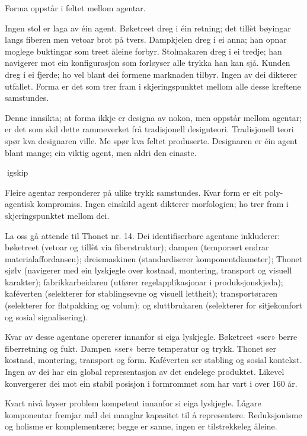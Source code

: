
Forma oppstår i feltet mellom agentar.

Ingen stol er laga av éin agent. Bøketreet dreg i éin retning; det tillèt bøyingar langs fiberen men vetoar brot på tvers. Dampkjelen dreg i ei anna; han opnar moglege buktingar som treet åleine forbyr. Stolmakaren dreg i ei tredje; han navigerer mot ein konfigurasjon som forløyser alle trykka han kan sjå. Kunden dreg i ei fjerde; ho vel blant dei formene marknaden tilbyr. Ingen av dei dikterer utfallet. Forma er det som trer fram i skjeringspunktet mellom alle desse kreftene samstundes.

Denne innsikta; at forma ikkje er designa av nokon, men oppstår mellom agentar; er det som skil dette rammeverket frå tradisjonell designteori. Tradisjonell teori spør kva designaren ville. Me spør kva feltet produserte. Designaren er éin agent blant mange; ein viktig agent, men aldri den einaste.

igskip

Fleire agentar responderer på ulike trykk samstundes. Kvar form er eit poly-agentisk kompromiss. Ingen einskild agent dikterer morfologien; ho trer fram i skjeringspunktet mellom dei.

La oss gå attende til Thonet nr. 14. Dei identifiserbare agentane inkluderer: bøketreet (vetoar og tillèt via fiberstruktur); dampen (temporært endrar materialaffordansen); dreiemaskinen (standardiserer komponentdiameter); Thonet sjølv (navigerer med ein lyskjegle over kostnad, montering, transport og visuell karakter); fabrikkarbeidaren (utfører regelapplikasjonar i produksjonskjeda); kaféverten (selekterer for stablingsevne og visuell lettheit); transportøraren (selekterer for flatpakking og volum); og sluttbrukaren (selekterer for sitjekomfort og sosial signalisering).

Kvar av desse agentane opererer innanfor si eiga lyskjegle. Bøketreet «ser» berre fiberretning og fukt. Dampen «ser» berre temperatur og trykk. Thonet ser kostnad, montering, transport og form. Kaféverten ser stabling og sosial kontekst. Ingen av dei har ein global representasjon av det endelege produktet. Likevel konvergerer dei mot ein stabil posisjon i formrommet som har vart i over 160 år.

Kvart nivå løyser problem kompetent innanfor si eiga lyskjegle. Lågare komponentar fremjar mål dei manglar kapasitet til å representere. Reduksjonisme og holisme er komplementære; begge er sanne, ingen er tilstrekkeleg åleine.

